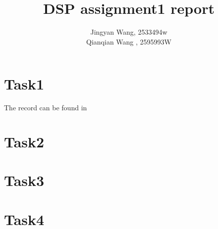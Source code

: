 \documentclass[a4paper,12pt]{article}
\begin{document}
%
   \title{\textbf{DSP assignment1 report}}

   \author{Jingyan Wang, 2533494w \\ Qianqian Wang , 2595993W}
          
   \date{}

   \maketitle
   
   \tableofcontents
 
  \newpage

\section{Task1}
The record can be found in 
\section{Task2}
\section{Task3}
\section{Task4}
\end{document}
